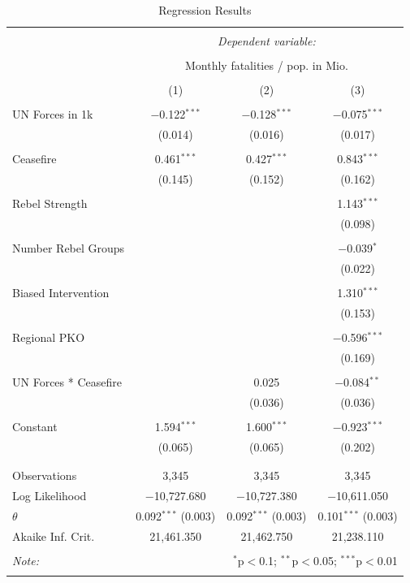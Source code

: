 \documentclass[12pt,english,a4paper,oneside]{article}
\begin{document}
\begin{table}[!htbp] \centering 
  \caption{Regression Results} 
  \label{tab:table} 
\begin{tabular}{@{\extracolsep{5pt}}lccc} 
\\[-1.8ex]\hline 
\hline \\[-1.8ex] 
 & \multicolumn{3}{c}{\textit{Dependent variable:}} \\ 
\cline{2-4} 
\\[-1.8ex] & \multicolumn{3}{c}{Monthly fatalities / pop. in Mio.} \\ 
\\[-1.8ex] & (1) & (2) & (3)\\ 
\hline \\[-1.8ex] 
 UN Forces in 1k & $-$0.122$^{***}$ & $-$0.128$^{***}$ & $-$0.075$^{***}$ \\ 
  & (0.014) & (0.016) & (0.017) \\ 
  & & & \\ 
 Ceasefire & 0.461$^{***}$ & 0.427$^{***}$ & 0.843$^{***}$ \\ 
  & (0.145) & (0.152) & (0.162) \\ 
  & & & \\ 
 Rebel Strength &  &  & 1.143$^{***}$ \\ 
  &  &  & (0.098) \\ 
  & & & \\ 
 Number Rebel Groups &  &  & $-$0.039$^{*}$ \\ 
  &  &  & (0.022) \\ 
  & & & \\ 
 Biased Intervention &  &  & 1.310$^{***}$ \\ 
  &  &  & (0.153) \\ 
  & & & \\ 
 Regional PKO &  &  & $-$0.596$^{***}$ \\ 
  &  &  & (0.169) \\ 
  & & & \\ 
 UN Forces * Ceasefire &  & 0.025 & $-$0.084$^{**}$ \\ 
  &  & (0.036) & (0.036) \\ 
  & & & \\ 
 Constant & 1.594$^{***}$ & 1.600$^{***}$ & $-$0.923$^{***}$ \\ 
  & (0.065) & (0.065) & (0.202) \\ 
  & & & \\ 
\hline \\[-1.8ex] 
Observations & 3,345 & 3,345 & 3,345 \\ 
Log Likelihood & $-$10,727.680 & $-$10,727.380 & $-$10,611.050 \\ 
$\theta$ & 0.092$^{***}$  (0.003) & 0.092$^{***}$  (0.003) & 0.101$^{***}$  (0.003) \\ 
Akaike Inf. Crit. & 21,461.350 & 21,462.750 & 21,238.110 \\ 
\hline 
\hline \\[-1.8ex] 
\textit{Note:}  & \multicolumn{3}{r}{$^{*}$p$<$0.1; $^{**}$p$<$0.05; $^{***}$p$<$0.01} \\ 
 & \multicolumn{3}{r}{} \\ 
\end{tabular} 
\end{table}
\end{document}
